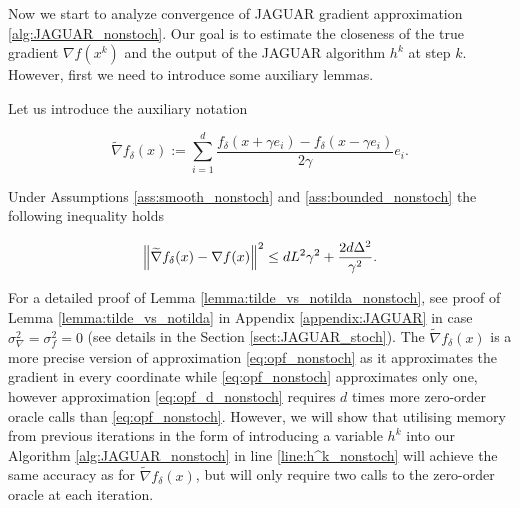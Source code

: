         Now we start to analyze convergence of JAGUAR gradient approximation \ref{alg:JAGUAR_nonstoch}. Our goal is to estimate the closeness of the true gradient $\nabla f(x^k)$ and the output of the JAGUAR algorithm $h^k$ at step $k$. However, first we need to introduce some auxiliary lemmas.

        \begin{lemma}
            \label{lemma:tilde_vs_notilda_nonstoch}
            Let us introduce the auxiliary notation
    
            \begin{equation}
            \label{eq:opf_d_nonstoch}
                \widetilde{\nabla}f_{\delta}(x) := \sum\limits_{i=1}^d \dfrac{f_{\delta}(x + \gamma e_i) - f_{\delta}(x - \gamma e_i)}{2 \gamma} e_i.
            \end{equation}
            
            Under Assumptions \ref{ass:smooth_nonstoch} and \ref{ass:bounded_nonstoch} the following inequality holds
    
            \begin{equation}
            \label{eq:diff_full_nonstoch}
                \left\| \widetilde{\nabla}f_{\delta}(x) - \nabla f(x) \right\|^2
                \leq d L^2 \gamma^2 
                + \frac{2 d \Delta^2}{\gamma^2}.
            \end{equation}
        \end{lemma}
    
        For a detailed proof of Lemma \ref{lemma:tilde_vs_notilda_nonstoch}, see proof of Lemma \ref{lemma:tilde_vs_notilda} in Appendix \ref{appendix:JAGUAR} in case $\sigma_\nabla^2 = \sigma_f^2 = 0$ (see details in the Section \ref{sect:JAGUAR_stoch}). 
        The $\widetilde{\nabla}f_{\delta}(x)$ is a more precise version of approximation \eqref{eq:opf_nonstoch} as it approximates the gradient in every coordinate while \eqref{eq:opf_nonstoch} approximates only one, however approximation \eqref{eq:opf_d_nonstoch} requires $d$ times more zero-order oracle calls than \eqref{eq:opf_nonstoch}. However, we will show that utilising memory from previous iterations in the form of introducing a variable $h^k$ into our Algorithm \ref{alg:JAGUAR_nonstoch} in line \ref{line:h^k_nonstoch} will achieve the same accuracy as for $\widetilde{\nabla}f_{\delta}(x)$, but will only require two calls to the zero-order oracle at each iteration.
    
    
